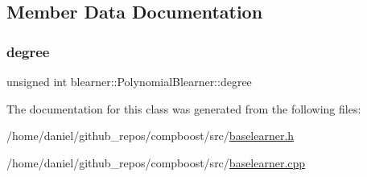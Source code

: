 \subsection{Member Data Documentation}
\mbox{\label{classblearner_1_1_polynomial_blearner_a7a522e19634367a4bfad2d6ea532ec44}} 
\subsubsection{\texorpdfstring{degree}{degree}}
{\footnotesize\ttfamily unsigned int blearner\+::\+Polynomial\+Blearner\+::degree\hspace{0.3cm}{\ttfamily [private]}}



The documentation for this class was generated from the following files\+:\begin{DoxyCompactItemize}
\item 
/home/daniel/github\+\_\+repos/compboost/src/\hyperlink{baselearner_8h}{baselearner.\+h}\item 
/home/daniel/github\+\_\+repos/compboost/src/\hyperlink{baselearner_8cpp}{baselearner.\+cpp}\end{DoxyCompactItemize}
